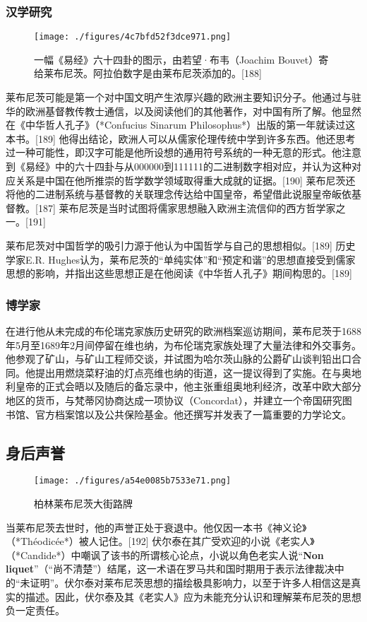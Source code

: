 \subsubsection{汉学研究}
\begin{figure}[ht]
\centering
\texttt{[image: ./figures/4c7bfd52f3dce971.png]}
\caption{一幅《易经》六十四卦的图示，由若望·布韦（Joachim Bouvet）寄给莱布尼茨。阿拉伯数字是由莱布尼茨添加的。[188]} \label{fig_LBNC_6}
\end{figure}
莱布尼茨可能是第一个对中国文明产生浓厚兴趣的欧洲主要知识分子。他通过与驻华的欧洲基督教传教士通信，以及阅读他们的其他著作，对中国有所了解。他显然在《中华哲人孔子》（*Confucius Sinarum Philosophus*）出版的第一年就读过这本书。[189] 他得出结论，欧洲人可以从儒家伦理传统中学到许多东西。他还思考过一种可能性，即汉字可能是他所设想的通用符号系统的一种无意的形式。他注意到《易经》中的六十四卦与从000000到111111的二进制数字相对应，并认为这种对应关系是中国在他所推崇的哲学数学领域取得重大成就的证据。[190] 莱布尼茨还将他的二进制系统与基督教的关联理念传达给中国皇帝，希望借此说服皇帝皈依基督教。[187] 莱布尼茨是当时试图将儒家思想融入欧洲主流信仰的西方哲学家之一。[191]

莱布尼茨对中国哲学的吸引力源于他认为中国哲学与自己的思想相似。[189] 历史学家E.R. Hughes认为，莱布尼茨的“单纯实体”和“预定和谐”的思想直接受到儒家思想的影响，并指出这些思想正是在他阅读《中华哲人孔子》期间构思的。[189]
\subsubsection{博学家}
在进行他从未完成的布伦瑞克家族历史研究的欧洲档案巡访期间，莱布尼茨于1688年5月至1689年2月间停留在维也纳，为布伦瑞克家族处理了大量法律和外交事务。他参观了矿山，与矿山工程师交谈，并试图为哈尔茨山脉的公爵矿山谈判铅出口合同。他提出用燃烧菜籽油的灯点亮维也纳的街道，这一提议得到了实施。在与奥地利皇帝的正式会晤以及随后的备忘录中，他主张重组奥地利经济，改革中欧大部分地区的货币，与梵蒂冈协商达成一项协议（Concordat），并建立一个帝国研究图书馆、官方档案馆以及公共保险基金。他还撰写并发表了一篇重要的力学论文。
\subsection{身后声誉}
\begin{figure}[ht]
\centering
\texttt{[image: ./figures/a54e0085b7533e71.png]}
\caption{柏林莱布尼茨大街路牌} \label{fig_LBNC_7}
\end{figure}
当莱布尼茨去世时，他的声誉正处于衰退中。他仅因一本书《神义论》（*Théodicée*）被人记住。[192] 伏尔泰在其广受欢迎的小说《老实人》（*Candide*）中嘲讽了该书的所谓核心论点，小说以角色老实人说“\textbf{Non liquet}”（“尚不清楚”）结尾，这一术语在罗马共和国时期用于表示法律裁决中的“未证明”。伏尔泰对莱布尼茨思想的描绘极具影响力，以至于许多人相信这是真实的描述。因此，伏尔泰及其《老实人》应为未能充分认识和理解莱布尼茨的思想负一定责任。

